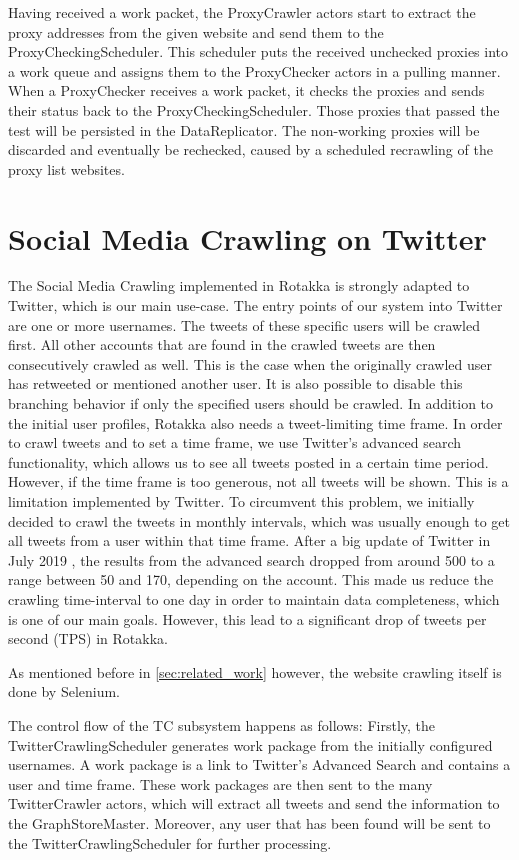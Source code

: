 \documentclass{sigchi}
\begin{document}
Having received a work packet, the ProxyCrawler actors start to extract the proxy addresses from the given website and send them to the ProxyCheckingScheduler. This scheduler puts the received unchecked proxies into a work queue and assigns them to the ProxyChecker actors in a pulling manner.
When a ProxyChecker receives a work packet, it checks the proxies and sends their status back to the ProxyCheckingScheduler. Those proxies that passed the test will be persisted in the DataReplicator. The non-working proxies will be discarded and eventually be rechecked, caused by a scheduled recrawling of the proxy list websites.

\section{Social Media Crawling on Twitter}

The Social Media Crawling implemented in Rotakka is strongly adapted to Twitter, which is our main use-case. The entry points of our system into Twitter are one or more usernames. The tweets of these specific users will be crawled first. All other accounts that are found in the crawled tweets are then consecutively crawled as well. This is the case when the originally crawled user has retweeted or mentioned another user. It is also possible to disable this branching behavior if only the specified users should be crawled. In addition to the initial user profiles, Rotakka also needs a tweet-limiting time frame. In order to crawl tweets and to set a time frame, we use Twitter's advanced search functionality, which allows us to see all tweets posted in a certain time period. However, if the time frame is too generous, not all tweets will be shown. This is a limitation implemented by Twitter. To circumvent this problem, we initially decided to crawl the tweets in monthly intervals, which was usually enough to get all tweets from a user within that time frame. After a big update of Twitter in July 2019 \cite{twitter:update}, the results from the advanced search dropped from around 500 to a range between 50 and 170, depending on the account. This made us reduce the crawling time-interval to one day in order to maintain data completeness, which is one of our main goals. However, this lead to a significant drop of tweets per second (TPS) in Rotakka.

As mentioned before in \autoref{sec:related_work} however, the website crawling itself is done by Selenium. 

The control flow of the TC subsystem happens as follows: Firstly, the TwitterCrawlingScheduler generates work package from the initially configured usernames. A work package is a link to Twitter's Advanced Search and contains a user and time frame. These work packages are then sent to the many TwitterCrawler actors, which will extract all tweets and send the information to the GraphStoreMaster. Moreover, any user that has been found will be sent to the TwitterCrawlingScheduler for further processing.
\end{document}
